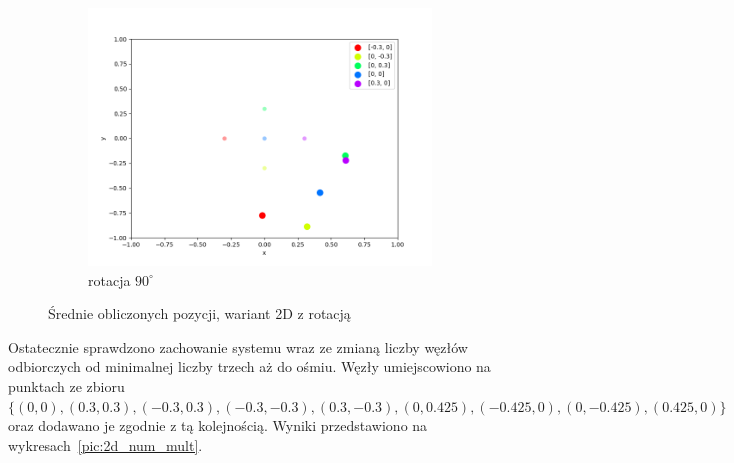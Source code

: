 \begin{figure}[h]
\begin{subfigure}{.5\textwidth}
    \includegraphics[width=\linewidth]{pics/mult_lat_2d_angle/positions_90_mean.png}
\caption{rotacja $90^{\circ}$}
\label{pic:2d_90_angle_mult}
\end{subfigure}
\caption{Średnie obliczonych pozycji, wariant 2D z rotacją}
\label{pic:2d_angle_mult}
\end{figure}

Ostatecznie sprawdzono zachowanie systemu wraz ze zmianą liczby węzłów odbiorczych od minimalnej liczby trzech aż do ośmiu. Węzły umiejscowiono na punktach ze zbioru $\{(0,0), (0.3,0.3), (-0.3,0.3), (-0.3,-0.3), (0.3,-0.3), (0, 0.425), (-0.425, 0), (0, -0.425), (0.425, 0)\}$ oraz dodawano je zgodnie z tą kolejnością. Wyniki przedstawiono na wykresach~\ref{pic:2d_num_mult}. 

